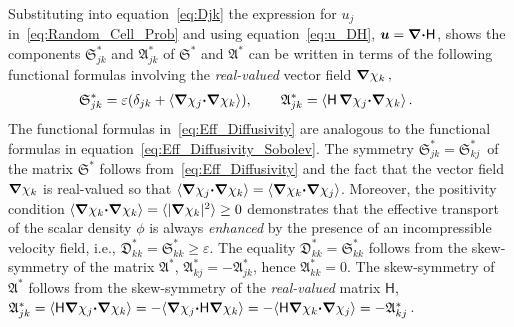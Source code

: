 \documentclass[english,12pt,jmp,graphicx]{revtex4-1}
\newcommand{\vecu}{\boldsymbol{u}}
\newcommand{\appref}[1]{Appendix~\ref{#1}}
\newcommand{\bnabla}{\mbox{\boldmath${\nabla}$}}
\newcommand{\bcdot}{\mbox{\boldmath${\cdot}$}}
\newcommand{\Sg}{\mathfrak{S}}
\newcommand{\Ag}{\mathfrak{A}}
\newcommand{\Dg}{\mathfrak{D}}
\newcommand{\Hm}{\mathsf{H}}
\begin{document}
Substituting into equation~\eqref{eq:Djk} the expression for $u_j$
in~\eqref{eq:Random_Cell_Prob} and using
equation~\eqref{eq:u_DH}, $\vecu=\bnabla\bcdot\Hm$, shows the 
components $\Sg^*_{jk}$ and $\Ag^*_{jk}$
of $\Sg^*$ and $\Ag^*$ 
can be written in terms of the following functional formulas involving 
the \emph{real-valued} vector field $\bnabla\chi_k\,,$  
%
\begin{align}\label{eq:Eff_Diffusivity}
 \Sg^*_{jk}=\varepsilon(\delta_{jk}+\langle\bnabla \chi_j\bcdot\bnabla \chi_k\rangle), \qquad
 \Ag^*_{jk}=\langle\Hm\,\bnabla \chi_j\bcdot\bnabla \chi_k\rangle\,. \qquad 
\end{align}
%
%
The functional formulas in~\eqref{eq:Eff_Diffusivity} 
are analogous to the functional formulas in
equation~\eqref{eq:Eff_Diffusivity_Sobolev}.
The symmetry $\Sg^*_{jk}=\Sg^*_{kj}\,$ of the matrix $\Sg^*$
follows from~\eqref{eq:Eff_Diffusivity} and the fact that the vector
field $\bnabla \chi_k$ is real-valued so that
$\langle\bnabla\chi_j\bcdot\bnabla\chi_k\rangle=\langle\bnabla\chi_k\bcdot\bnabla\chi_j\rangle$. Moreover,
the positivity condition
$\langle\bnabla\chi_k\bcdot\bnabla\chi_k\rangle=\langle|\bnabla\chi_k|^2\rangle\geq0$ demonstrates that
the effective transport of the scalar density $\phi$ is always
\emph{enhanced}
by the presence of an incompressible velocity field, i.e.,
$\Dg^*_{kk}=\Sg^*_{kk}\geq\varepsilon$. The equality $\Dg^*_{kk}=\Sg^*_{kk}$
follows from the skew-symmetry of the matrix $\Ag^*$, 
$\Ag^*_{kj}=-\Ag^*_{jk}$, hence $\Ag^*_{kk}=0$. The skew-symmetry of
$\Ag^*$ follows from the skew-symmetry of the \emph{real-valued}
matrix $\Hm$, 
$\Ag^*_{jk}=\langle\Hm\bnabla\chi_j\bcdot\bnabla\chi_k\rangle=-\langle\bnabla\chi_j\bcdot\Hm\bnabla\chi_k\rangle
=-\langle\Hm\bnabla\chi_k\bcdot\bnabla\chi_j\rangle=-\Ag^*_{kj}\,$.
\end{document}
